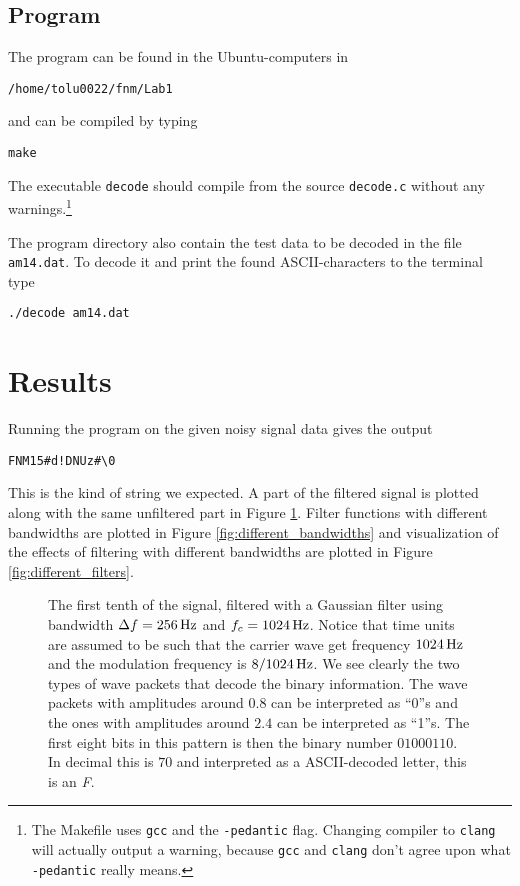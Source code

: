 \documentclass[12pt,a4paper]{article}
\begin{document}
\subsection{Program}
The program can be found in the Ubuntu-computers in %
\begin{verbatim}
/home/tolu0022/fnm/Lab1
\end{verbatim}
and can be compiled by typing
\begin{verbatim}
make
\end{verbatim}
The executable \texttt{decode} should compile from the source \texttt{decode.c}
without any warnings.\footnote{The Makefile uses \texttt{gcc} and the \texttt{-pedantic} flag.
Changing compiler to \texttt{clang} will actually output a warning, because \texttt{gcc} and
\texttt{clang} don't agree upon what \texttt{-pedantic} really means.}

The program directory also contain the test data to be decoded in the file \texttt{am14.dat}.
To decode it and print the found ASCII-characters to the terminal type
\begin{verbatim}
./decode am14.dat
\end{verbatim}

\section{Results}\label{sec:results}
Running the program on the given noisy signal data gives the output
\begin{verbatim}
FNM15#d!DNUz#\0
\end{verbatim}

This is the kind of string we expected. A part of the filtered signal
is plotted along with the same unfiltered part in Figure \ref{fig:filtered_with_bandwidth_256}.
Filter functions with different bandwidths are plotted in Figure \ref{fig:different_bandwidths}
and visualization of the effects of filtering with different bandwidths are plotted
in Figure \ref{fig:different_filters}.

\begin{figure}
  \begin{small}
  \centering
  
  \caption{The first tenth of the signal, filtered with a Gaussian
    filter using bandwidth
    $\Delta f = \unit[256]{Hz}$ and $f_c = \unit[1024]{Hz}$.
    Notice that time units are assumed to be such that the carrier wave
    get frequency $\unit[1024]{Hz}$ and the modulation frequency
    is $\unit[8/1024]{Hz}$.
    We see clearly the two types of
    wave packets that decode the binary information.
    The wave packets with amplitudes
    around $0.8$ can be interpreted as ``0''s
    and the ones with amplitudes around $2.4$ can be interpreted as ``1''s.
    The first eight bits in this pattern is then the binary number $01000110$.
    In decimal this is $70$ and interpreted as a
    ASCII-decoded letter, this is an \textit{F}.
  }
  \label{fig:filtered_with_bandwidth_256}
  \end{small}
\end{figure}
\end{document}
